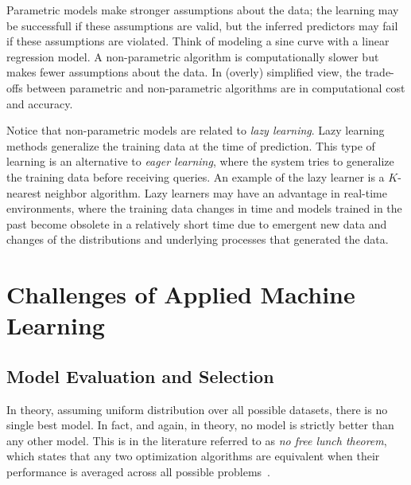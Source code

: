 \begin{refsection}
Parametric models make stronger assumptions about the data; the learning may be successfull if these assumptions are valid, but the inferred predictors may fail if these assumptions are violated. Think of modeling a sine curve with a linear regression model. A non-parametric algorithm is computationally slower but makes fewer assumptions about the data. In (overly) simplified view, the trade-offs between parametric and non-parametric algorithms are in computational cost and accuracy.

Notice that non-parametric models are related to {\em lazy learning}. Lazy learning methods generalize the training data at the time of prediction. This type of learning is an alternative to {\em eager learning}, where the system tries to generalize the training data before receiving queries. An example of the lazy learner is a $K$-nearest neighbor algorithm. Lazy learners may have an advantage in real-time environments, where the training data changes in time and models trained in the past become obsolete in a relatively short time due to emergent new data and changes of the distributions and underlying processes that generated the data.


\section{Challenges of Applied Machine Learning}

\subsection*{Model Evaluation and Selection}

In theory, assuming uniform distribution over all possible datasets, there is no single best model. In fact, and again, in theory, no model is strictly better than any other model. This is in the literature referred to as {\em no free lunch theorem}, which states that any two optimization algorithms are equivalent when their performance is averaged across all possible problems~\citep{2005-Wolpert-Macready}. 


\end{refsection}
